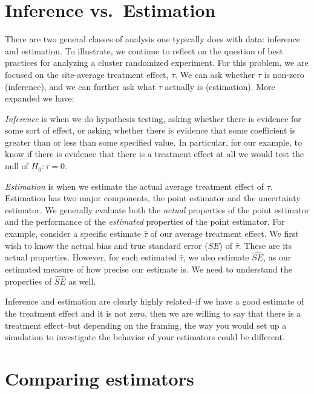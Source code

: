 \documentclass[
]{book}
\begin{document}
\hypertarget{inference-vs.-estimation}{%
\section{Inference vs.~Estimation}\label{inference-vs.-estimation}}

There are two general classes of analysis one typically does with data: inference and estimation.
To illustrate, we continue to reflect on the question of best practices for analyzing a cluster randomized experiment.
For this problem, we are focused on the site-average treatment effect, \(\tau\).
We can ask whether \(\tau\) is non-zero (inference), and we can further ask what \(\tau\) actually is (estimation).
More expanded we have:

\emph{Inference} is when we do hypothesis testing, asking whether there is evidence for some sort of effect, or asking whether there is evidence that some coefficient is greater than or less than some specified value.
In particular, for our example, to know if there is evidence that there is a treatment effect at all we would test the null of \(H_0: \tau = 0\).

\emph{Estimation} is when we estimate the actual average treatment effect of \(\tau\).
Estimation has two major components, the point estimator and the uncertainty estimator.
We generally evaluate both the \emph{actual} properties of the point estimator and the performance of the \emph{estimated} properties of the point estimator.
For example, consider a specific estimate \(\hat{\tau}\) of our average treatment effect.
We first wish to know the actual bias and true standard error (\(SE\)) of \(\hat{\tau}\).
These are its actual properties.
However, for each estimated \(\hat{\tau}\), we also estimate \(\widehat{SE}\), as our estimated measure of how precise our estimate is.
We need to understand the properties of \(\widehat{SE}\) as well.

Inference and estimation are clearly highly related--if we have a good estimate of the treatment effect and it is not zero, then we are willing to say that there is a treatment effect--but depending on the framing, the way you would set up a simulation to investigate the behavior of your estimators could be different.

\hypertarget{comparing-estimators}{%
\section{Comparing estimators}\label{comparing-estimators}}
\end{document}
